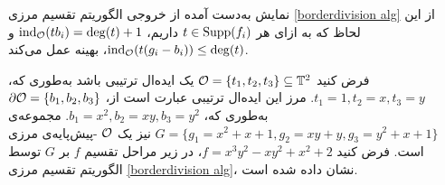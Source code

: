 \begin{remark}
نمایش به‌دست  آمده از خروجی الگوریتم تقسیم مرزی
\ref{borderdivision alg}
از این لحاظ که به ازای هر 
$t\in \operatorname{\mathrm{Supp}}(f_{i})$
داریم، 
$\operatorname{\mathrm{ind}}_{{\mathcal O}}(tb_{i}) = \deg(t) + 1$
و
$\operatorname{\mathrm{ind}}_{{\mathcal O}}(t(g_{i} - b_{i}))\leq \deg(t)$،
بهینه عمل می‌کند. 
\end{remark}

\begin{example}
	\label{example of border dvi}
فرض کنید 
${\mathcal O} = \{t_{1},t_{2},t_{3}\}\subseteq\mathbb{T}^{2}$
یک ایده‌ال ترتیبی باشد به‌طوری که، 
$t_{1} = 1, t_{2} = x, t_{3} = y$.
مرز این ایده‌ال ترتیبی عبارت است از، 
$\partial\mathcal{O} = \{b_{1},b_{2},b_{3}\}$
به‌طوری که، 
$b_{1} = x^{2}, b_{2} = xy, b_{3} = y^{2}$.
مجموعه‌ی 
$G = \{g_{1} = x^{2} + x + 1, g_{2} = xy + y, g_{3} = y^{2} + x + 1\}$
نیز یک 
${\mathcal O}$
-پیش‌پایه‌ی مرزی است. فرض کنید 
$f = x^{3}y^{2} - xy^{2} + x^{2} +2$،
در زیر مراحل تقسیم 
$f$
بر 
$G$
توسط الگوریتم تقسیم مرزی
\ref{borderdivision alg}،
نشان داده شده است.


\end{example}
